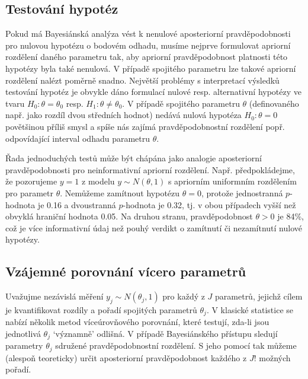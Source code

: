 \subsection{Testování hypotéz}

Pokud má Bayesiánská analýza vést k nenulové aposteriorní pravděpodobnosti pro nulovou hypotézu o bodovém odhadu, musíme nejprve formulovat apriorní rozdělení daného parametru tak, aby apriorní pravděpodobnost platnosti této hypotézy byla také nenulová. V případě spojitého parametru lze takové apriorní rozdělení nalézt poměrně snadno. Největší problémy s interpretací výsledků testování hypotéz je obvykle dáno formulací nulové resp. alternativní hypotézy ve tvaru $H_0: \theta = \theta_0$ resp. $H_1: \theta \ne \theta_0$. V případě spojitého parametru $\theta$ (definovaného např. jako rozdíl dvou středních hodnot) nedává nulová hypotéza $H_0: \theta = 0$ povětšinou příliš smysl a spíše nás zajímá pravděpodobnostní rozdělení popř. odpovídající interval odhadu parametru $\theta$.

Řada jednoduchých testů může být chápána jako analogie aposteriorní pravděpodobnosti pro neinformativní apriorní rozdělení. Např. předpokládejme, že pozorujeme $y = 1$ z modelu $y \sim N(\theta, 1)$ s apriorním uniformním rozdělením pro parametr $\theta$. Nemůžeme zamítnout hypotézu $\theta = 0$, protože jednostranná $p$-hodnota je 0.16 a dvoustranná $p$-hodnota je 0.32, tj. v obou případech vyšší než obvyklá hraniční hodnota 0.05. Na druhou stranu, pravděpodobnost $\theta > 0$ je 84\%, což je více informativní údaj než pouhý verdikt o zamítnutí či nezamítnutí nulové hypotézy.

\subsection{Vzájemné porovnání vícero parametrů}

Uvažujme nezávislá měření $y_j \sim N(\theta_j, 1)$ pro každý z $J$ parametrů, jejichž cílem je kvantifikovat rozdíly a pořadí spojitých parametrů $\theta_j$. V klasické statistice se nabízí několik metod víceúrovňového porovnání, které testují, zda-li jsou jednotlivá $\theta_j$ `významně' odlišná. V případě Bayesiánského přístupu sledují parametry $\theta_j$ sdružené pravděpodobnostní rozdělení. S jeho pomocí tak můžeme (alespoň teoreticky) určit aposteriorní pravděpodobnost každého z $J!$ možných pořadí.